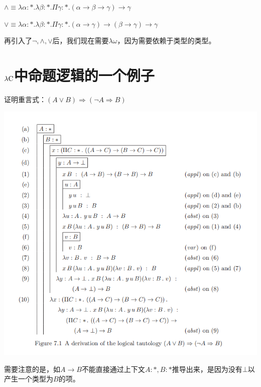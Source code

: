 \documentclass[UTF8]{article}
\begin{document}
		$\land\equiv\lambda\alpha:*.\lambda\beta:*.\Pi\gamma:*.(\alpha\rightarrow\beta\rightarrow\gamma)\rightarrow\gamma$
		
		$\lor\equiv\lambda\alpha:*.\lambda\beta:*.\Pi\gamma:*.(\alpha\rightarrow\gamma)\rightarrow(\beta\rightarrow\gamma)\rightarrow\gamma$
		
		再引入了$\neg,\land,\lor$后，我们现在需要$\lambda{\omega}$，因为需要依赖于类型的类型。
	
	\section{$\lambda{\rm C}$中命题逻辑的一个例子}
	\noindent
	证明重言式：$(A\lor B)\Rightarrow(\neg A\Rightarrow B)$
	
	\noindent
	\includegraphics[width=0.93\linewidth]{"../imgs/7-1.png"}
	
	需要注意的是，如$A\rightarrow B$不能直接通过上下文$A:*,B:*$推导出来，是因为没有$\bot$以产生一个类型为$B$的项。
\end{document}
